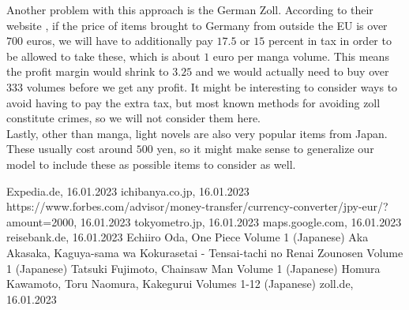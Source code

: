 \documentclass{article}
\begin{document}
Another problem with this approach is the German Zoll.
According to their website \cite{zoll}, if the price of items brought to Germany from outside the EU is over $700$ euros, we will have to additionally pay $17.5$ or $15$ percent in tax in order to be allowed to take these, which is about $1$ euro per manga volume. 
This means the profit margin would shrink to $3.25$ and we would actually need to buy over $333$ volumes before we get any profit. 
It might be interesting to consider ways to avoid having to pay the extra tax, but most known methods for avoiding zoll constitute crimes, so we will not consider them here.\\

Lastly, other than manga, light novels are also very popular items from Japan.
These usually cost around $500$ yen, so it might make sense to generalize our model to include these as possible items to consider as well.

\begin{thebibliography}{9}
 Expedia.de, 16.01.2023
 ichibanya.co.jp, 16.01.2023
 https://www.forbes.com/advisor/money-transfer/currency-converter/jpy-eur/?amount=2000, 16.01.2023
 tokyometro.jp, 16.01.2023
 maps.google.com, 16.01.2023
 reisebank.de, 16.01.2023
 Echiiro Oda, One Piece Volume 1 (Japanese)
 Aka Akasaka, Kaguya-sama wa Kokurasetai - Tensai-tachi no Renai Zounosen Volume 1 (Japanese)
 Tatsuki Fujimoto, Chainsaw Man Volume 1 (Japanese)
 Homura Kawamoto, Toru Naomura, Kakegurui Volumes 1-12 (Japanese)
 zoll.de, 16.01.2023
\end{thebibliography}
\end{document}
